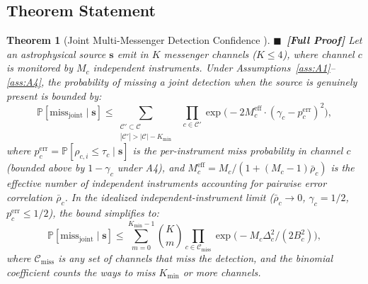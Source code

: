 \documentclass[11pt,a4paper]{article}
\newtheorem{theorem}{Theorem}[section]
\theoremstyle{definition}
\newcommand{\rigorFull}[0]{$\blacksquare$~\textbf{[Full Proof]}}
\newcommand{\Pbb}{\mathbb{P}}
\begin{document}
\subsection{Theorem Statement}
\begin{theorem}[Joint Multi-Messenger Detection Confidence ]\label{thm:joint_detection}
\rigorFull
Let an astrophysical source $\mathbf{s}$ emit in $K$ messenger channels ($K \leq 4$), where channel $c$ is monitored by $M_c$ independent instruments. Under Assumptions~\ref{ass:A1}--\ref{ass:A4}, the probability of missing a joint detection when the source is genuinely present is bounded by:
\begin{equation}\label{eq:joint_bound}
\Pbb[\text{miss}_{\mathrm{joint}} \mid \mathbf{s}] \leq \sum_{\substack{\mathcal{C}' \subset \mathcal{C} \\ |\mathcal{C}'| > |\mathcal{C}| - K_{\mathrm{min}}}} \;\; \prod_{c \in \mathcal{C}'} \exp\bigl(-2 M_c^{\mathrm{eff}} \cdot (\gamma_c - p_c^{\mathrm{err}})^2 \bigr),
\end{equation}
where $p_c^{\mathrm{err}} = \Pbb[\rho_{c,i} \leq \tau_c \mid \mathbf{s}]$ is the per-instrument miss probability in channel $c$ (bounded above by $1 - \gamma_c$ under A4), and $M_c^{\mathrm{eff}} = M_c / (1 + (M_c-1)\bar{\rho}_c)$ is the effective number of independent instruments accounting for pairwise error correlation $\bar{\rho}_c$.
In the idealized independent-instrument limit ($\bar{\rho}_c \to 0$, $\gamma_c = 1/2$, $p_c^{\mathrm{err}} \leq 1/2$), the bound simplifies to:
\begin{equation}\label{eq:joint_bound_simple}
\Pbb[\text{miss}_{\mathrm{joint}} \mid \mathbf{s}] \leq \sum_{m=0}^{K_{\mathrm{min}}-1} \binom{K}{m} \prod_{c \in \mathcal{C}_{\mathrm{miss}}} \exp\bigl(-M_c \Delta_c^2 / (2 B_c^2)\bigr),
\end{equation}
where $\mathcal{C}_{\mathrm{miss}}$ is any set of channels that miss the detection, and the binomial coefficient counts the ways to miss $K_{\mathrm{min}}$ or more channels.
\end{theorem}
\end{document}
